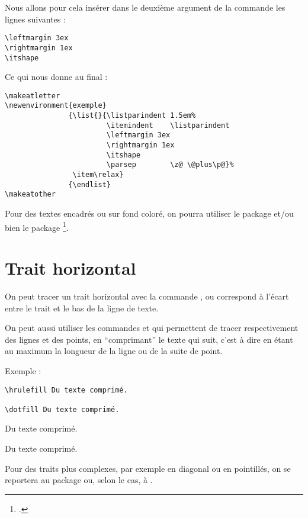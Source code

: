 Nous allons pour cela insérer dans le deuxième argument de la commande  les lignes suivantes :
\begin{verbatim}
\leftmargin 3ex
\rightmargin 1ex
\itshape
\end{verbatim}

Ce qui nous donne au final :

\begin{verbatim}
\makeatletter
\newenvironment{exemple}
               {\list{}{\listparindent 1.5em%
                        \itemindent    \listparindent
                        \leftmargin 3ex
		    			\rightmargin 1ex
		     			\itshape
                        \parsep        \z@ \@plus\p@}%
                \item\relax}
               {\endlist}
\makeatother
\end{verbatim}

\begin{plusloins}
Pour des textes encadrés ou sur fond coloré, on pourra utiliser le package  et/ou bien le package \footcites[On peut également consulter][qui regorge d'exemple pratique de \enquote{mise en boîte}]{frama}[on consultera en particulier][]{frama_boites}. 
\end{plusloins}

\section{Trait horizontal}

On peut tracer un trait horizontal avec la commande , ou  correspond à l'écart entre le trait et le bas de la ligne de texte.

On peut aussi utiliser les commandes  et  qui permettent de tracer respectivement des lignes et des points, en \enquote{comprimant} le texte qui suit, c'est à dire en étant au maximum la longueur de la ligne ou de la suite de point.

Exemple :
\begin{verbatim}
\hrulefill Du texte comprimé.

\dotfill Du texte comprimé.
\end{verbatim}


\hrulefill Du texte comprimé.

\dotfill Du texte comprimé.

Pour des traits plus complexes, par exemple en diagonal ou en pointillés, on se reportera au package  ou, selon le cas, à . 

